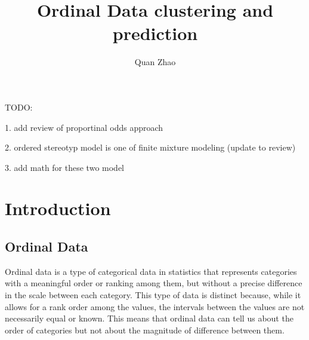 \documentclass{article}
\begin{document}
\title{Ordinal Data clustering and prediction}


TODO:

1. add review of proportinal odds approach

2. ordered stereotyp model is one of finite mixture modeling (update to review)

3. add math for  these two model

\author{Quan Zhao}

\maketitle



\section{Introduction}




\subsection*{Ordinal Data}

Ordinal data is a type of categorical data in statistics that represents categories with a meaningful order or ranking among them, but without a precise difference in the scale between each category. This type of data is distinct because, while it allows for a rank order among the values, the intervals between the values are not necessarily equal or known. This means that ordinal data can tell us about the order of categories but not about the magnitude of difference between them.
\end{document}
